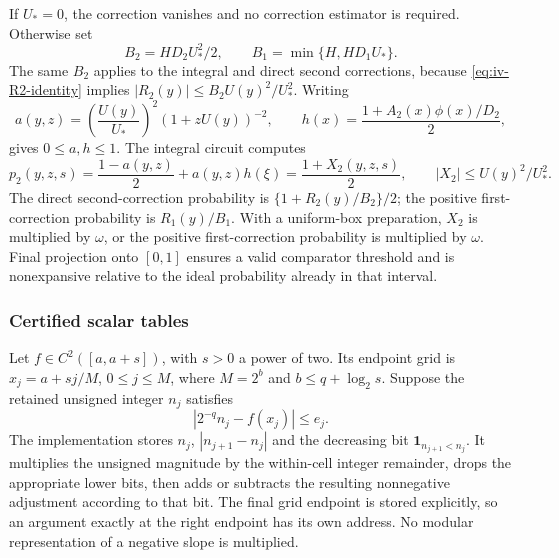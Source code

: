 If $U_*=0$, the correction vanishes and no correction estimator is required.
Otherwise set
\begin{equation}
 B_2=HD_2U_*^2/2,\qquad B_1=\min\{H,HD_1U_*\}.
 \label{eq:iv-normalisers}
\end{equation}
The same $B_2$ applies to the integral and direct second corrections, because
\eqref{eq:iv-R2-identity} implies
$|R_2(y)|\leq B_2U(y)^2/U_*^2$.
Writing
\begin{equation}
 a(y,z)=\left(\frac{U(y)}{U_*}\right)^2(1+zU(y))^{-2},\qquad
 h(x)=\frac{1+A_2(x)\phi(x)/D_2}{2},
 \label{eq:iv-a-h}
\end{equation}
gives $0\leq a,h\leq1$.  The integral circuit computes
\begin{equation}
 p_2(y,z,s)=\frac{1-a(y,z)}2+a(y,z)h(\xi)
          =\frac{1+X_2(y,z,s)}2,
 \qquad |X_2|\leq U(y)^2/U_*^2.
 \label{eq:iv-probability}
\end{equation}
The direct second-correction probability is
$\{1+R_2(y)/B_2\}/2$; the positive first-correction probability is
$R_1(y)/B_1$.  With a uniform-box preparation, $X_2$ is multiplied by
$\omega$, or the positive first-correction probability is multiplied by
$\omega$.  Final projection onto $[0,1]$ ensures a valid comparator threshold
and is nonexpansive relative to the ideal probability already in that interval.

\subsubsection{Certified scalar tables}

Let $f\in C^2([a,a+s])$, with $s>0$ a power of two.  Its endpoint grid is
$x_j=a+sj/M$, $0\leq j\leq M$, where $M=2^b$ and
$b\leq q+\log_2s$.  Suppose the retained unsigned integer $n_j$ satisfies
\begin{equation}
 |2^{-q}n_j-f(x_j)|\leq e_j.
 \label{eq:iv-node-enclosure}
\end{equation}
The implementation stores $n_j$, $|n_{j+1}-n_j|$ and the decreasing bit
$\boldsymbol 1_{n_{j+1}<n_j}$.  It multiplies the unsigned magnitude by
the within-cell integer remainder, drops the appropriate lower bits, then
adds or subtracts the resulting nonnegative adjustment according to that bit.
The final grid endpoint is stored explicitly, so an argument exactly at the
right endpoint has its own address.  No modular representation of a negative
slope is multiplied.

